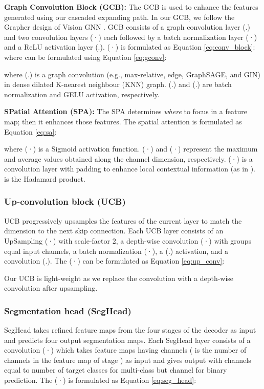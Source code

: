 \documentclass[10pt,twocolumn,letterpaper]{article}
\begin{document}
\textbf{Graph Convolution Block (GCB):} The GCB is used to enhance the features generated using our cascaded expanding path. In our GCB, we follow the Grapher design of Vision GNN \cite{han2022vision}. GCB consists of a graph convolution layer (.) and two  convolution layers (·) each followed by a batch normalization layer (·) and a ReLU activation layer (.). (·) is formulated as Equation \ref{eq:conv_block}:
where  can be formulated using Equation \ref{eq:gconv}:

where (.) is a graph convolution (e.g., max-relative, edge, GraphSAGE, and GIN) in dense dilated K-nearest neighbour (KNN) graph. (.) and (.) are batch normalization and GELU activation, respectively.



\textbf{SPatial Attention (SPA):} The SPA determines \textit{where} to focus in a feature map; then it enhances those features. The spatial attention is formulated as Equation \ref{eq:sa}:
\color{black}
\small

\normalsize \color{black}
where (·) is a Sigmoid activation function. (·) and (·) represent the maximum and average values obtained along the channel dimension, respectively. (·) is a  convolution layer with padding  to enhance local contextual information (as in \cite{dong2021polyp}).  is the Hadamard product.

\subsubsection{Up-convolution block (UCB)}
UCB progressively upsamples the features of the current layer to match the dimension to the next skip connection. Each UCB layer consists of an UpSampling (·) with scale-factor 2, a  depth-wise convolution (·) with groups equal input channels, a batch normalization (·), a (.) activation, and a  convolution (.). The (·) can be formulated as Equation \ref{eq:up_conv}:

Our UCB is light-weight as we replace the  convolution with a depth-wise convolution after upsampling.  

\subsubsection{Segmentation head (SegHead)}
SegHead takes refined feature maps from the four stages of the decoder as input and predicts four output segmentation maps. Each SegHead layer consists of a  convolution (·) which takes feature maps having  channels ( is the number of channels in the feature map of stage ) as input and gives output with channels equal to number of target classes for multi-class but  channel for binary prediction. The (·) is formulated as Equation \ref{eq:seg_head}:
\end{document}
